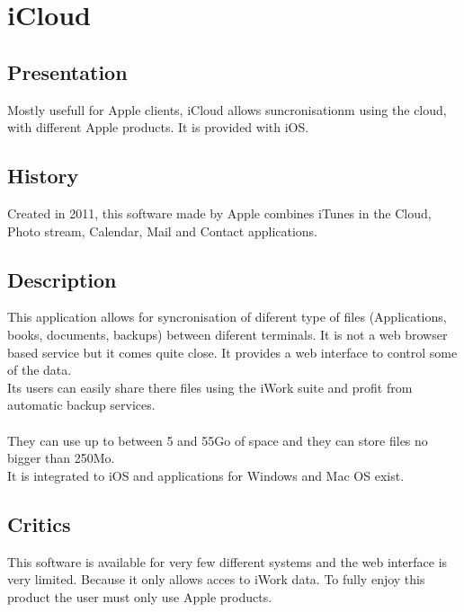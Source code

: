 \section{iCloud}
\thispagestyle{EIP} %

\subsection{Presentation}
Mostly usefull for Apple clients, iCloud allows suncronisationm using the cloud, with different Apple products. It is provided with iOS.\\

\subsection{History}
Created in 2011, this software made by Apple combines iTunes in the Cloud, Photo stream, Calendar, Mail and Contact applications.

\subsection{Description}
This application allows for syncronisation of diferent type of files (Applications, books, documents, backups) between diferent terminals. It is not a web browser based service but it comes quite close. It provides a web interface to control some of the data.\\
Its users can easily share there files using the iWork suite and profit from automatic backup services.\\
\\
They can use up to between 5 and 55Go of space and they can store files no bigger than 250Mo.\\
It is integrated to iOS and applications for Windows and Mac OS exist.\\

\subsection{Critics}
This software is available for very few different systems and the web interface is very limited. Because it only allows acces to iWork data. To fully enjoy this product the user must only use Apple products.\\
